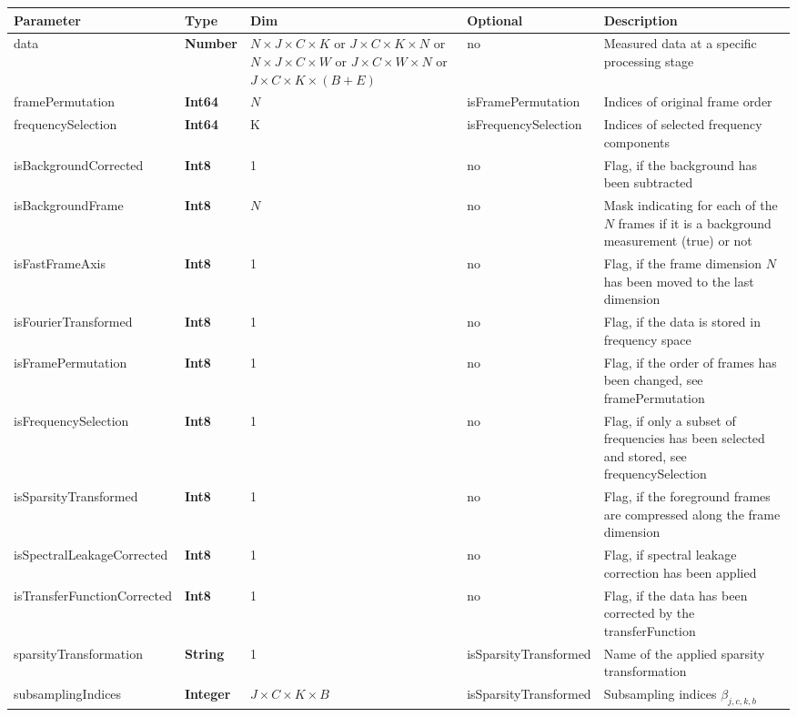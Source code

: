 \documentclass[landscape,a4paper]{article} %
\newcommand{\inltab}[1]{{\ttfamily\bfseries\color{blue}#1}}
\newcommand{\inlvar}[1]{{\ttfamily#1}}
\begin{document}
\setlength\extrarowheight{5pt}
\noindent \begin{tabularx}{\columnwidth}{llp{3cm}lX} 
\textbf{Parameter} & \textbf{Type} & \textbf{Dim} &  \textbf{Optional} & \textbf{Description} \\ \hline 
\inlvar{data} & \inltab{Number} & $N \times J \times C \times K$ or $ J \times C \times K\times N$ or $N \times J \times C \times W$ or $ J \times C \times W \times N$ or $J \times C \times K \times (B+E)$ & no & Measured data at a specific processing stage \\ \hline
\inlvar{framePermutation} & \inltab{Int64} & $N$ & \inlvar{isFramePermutation} & Indices of original frame order\\ \hline
\inlvar{frequencySelection} & \inltab{Int64} & K & \inlvar{isFrequencySelection} & Indices of selected frequency components \\ \hline
\inlvar{isBackgroundCorrected} & \inltab{Int8} & 1 & no & Flag, if the background has been subtracted \\ \hline
\inlvar{isBackgroundFrame} & \inltab{Int8} & $N$ & no & Mask indicating for each of the $N$ frames if it is a background measurement (true) or not \\ \hline
\inlvar{isFastFrameAxis} & \inltab{Int8} & 1 & no & Flag, if the frame dimension $N$ has been moved to the last dimension\\ \hline
\inlvar{isFourierTransformed} & \inltab{Int8} & 1 & no & Flag, if the data is stored in frequency space \\ \hline
\inlvar{isFramePermutation} & \inltab{Int8} & 1 & no & Flag, if the order of frames has been changed, see \inlvar{framePermutation} \\ \hline 
\inlvar{isFrequencySelection} & \inltab{Int8} & 1 & no & Flag, if only a subset of frequencies has been selected and stored, see \inlvar{frequencySelection}\\ \hline 
\inlvar{isSparsityTransformed} & \inltab{Int8} & 1 & no & Flag, if the foreground frames are compressed along the frame dimension \\ \hline
\inlvar{isSpectralLeakageCorrected} & \inltab{Int8} & 1 & no & Flag, if spectral leakage correction has been applied \\ \hline
\inlvar{isTransferFunctionCorrected} & \inltab{Int8} & 1 & no & Flag, if the data has been corrected by the \inlvar{transferFunction}\\ \hline 
\inlvar{sparsityTransformation} & \inltab{String} & 1 & \inlvar{isSparsityTransformed} & Name of the applied sparsity transformation\\ \hline
\inlvar{subsamplingIndices} & \inltab{Integer} & $ J \times C \times K \times B$ & \inlvar{isSparsityTransformed} & Subsampling indices $\beta_{j,c,k,b}$\\ \hline
\end{tabularx} 
\setlength\extrarowheight{0pt}
\end{document}
